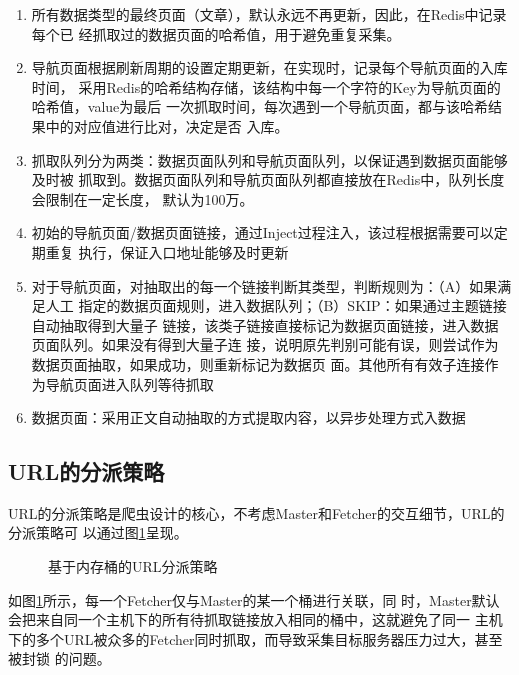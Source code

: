 \begin{enumerate}
\item 所有数据类型的最终页面（文章），默认永远不再更新，因此，在Redis中记录每个已
  经抓取过的数据页面的哈希值，用于避免重复采集。

\item 导航页面根据刷新周期的设置定期更新，在实现时，记录每个导航页面的入库时间，
  采用Redis的哈希结构存储，该结构中每一个字符的Key为导航页面的哈希值，value为最后
  一次抓取时间，每次遇到一个导航页面，都与该哈希结果中的对应值进行比对，决定是否
  入库。

\item 抓取队列分为两类：数据页面队列和导航页面队列，以保证遇到数据页面能够及时被
  抓取到。数据页面队列和导航页面队列都直接放在Redis中，队列长度会限制在一定长度，
  默认为100万。

\item 初始的导航页面/数据页面链接，通过Inject过程注入，该过程根据需要可以定期重复
  执行，保证入口地址能够及时更新

\item 对于导航页面，对抽取出的每一个链接判断其类型，判断规则为：（A）如果满足人工
  指定的数据页面规则，进入数据队列；（B）SKIP：如果通过主题链接自动抽取得到大量子
  链接，该类子链接直接标记为数据页面链接，进入数据页面队列。如果没有得到大量子连
  接，说明原先判别可能有误，则尝试作为数据页面抽取，如果成功，则重新标记为数据页
  面。其他所有有效子连接作为导航页面进入队列等待抓取

\item 数据页面：采用正文自动抽取的方式提取内容，以异步处理方式入数据
\end{enumerate}

\subsection{URL的分派策略}

URL的分派策略是爬虫设计的核心，不考虑Master和Fetcher的交互细节，URL的分派策略可
以通过图\ref{fig:bucket-dispatch}呈现。

\begin{figure}[ht!]
  \centering
  
  \caption{\label{fig:bucket-dispatch} 基于内存桶的URL分派策略}
\end{figure}

如图\ref{fig:bucket-dispatch}所示，每一个Fetcher仅与Master的某一个桶进行关联，同
时，Master默认会把来自同一个主机下的所有待抓取链接放入相同的桶中，这就避免了同一
主机下的多个URL被众多的Fetcher同时抓取，而导致采集目标服务器压力过大，甚至被封锁
的问题。

